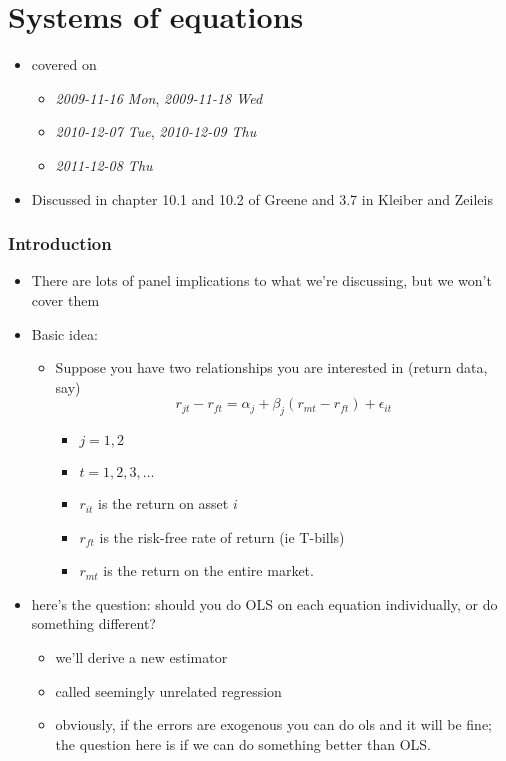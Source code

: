 
\part*{Systems of equations}%

\begin{itemize}
\item covered on
\begin{itemize}
\item \textit{2009-11-16 Mon}, \textit{2009-11-18 Wed}
\item \textit{2010-12-07 Tue}, \textit{2010-12-09 Thu}
\item \textit{2011-12-08 Thu}
\end{itemize}
\item Discussed in chapter 10.1 and 10.2 of Greene and 3.7 in Kleiber
     and Zeileis
\end{itemize}
\section{Introduction}
\label{sec-1}

\begin{itemize}
\item There are lots of panel implications to what we're discussing,
      but we won't cover them
\item Basic idea:
\begin{itemize}
\item Suppose you have two relationships you are interested in
        (return data, say)
        \[r_{jt} - r_{ft} = \alpha_j + \beta_j (r_{mt} - r_{ft}) +
        \epsilon_{it}\]
\begin{itemize}
\item $j = 1,2$
\item $t = 1,2,3,\dots$
\item $r_{it}$ is the return on asset $i$
\item $r_{ft}$ is the risk-free rate of return (ie T-bills)
\item $r_{mt}$ is the return on the entire market.
\end{itemize}
\end{itemize}
\item here's the question: should you do OLS on each equation
      individually, or do something different?
\begin{itemize}
\item we'll derive a new estimator
\item called seemingly unrelated regression
\item obviously, if the errors are exogenous you can do ols and it
        will be fine; the question here is if we can do something
        better than OLS.
\end{itemize}
\end{itemize}
